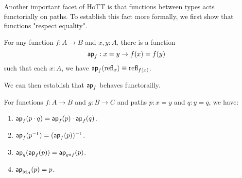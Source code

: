 \documentclass[main.tex]{subfiles}
\begin{document}
Another important facet of HoTT is that functions between types acts functorially on paths. To establish this fact more formally, we
first show that functions "respect equality".
\begin{lemma}
    For any function $f : A \to B$ and $x,y : A$, there is a function
    $$\mathsf{ap}_{f}: x = y \to f(x) = f(y)$$
    such that each $x : A$, we have $\mathsf{ap}_{f}(\text{refl}_{x}) \equiv \text{refl}_{f(x)}$.
\end{lemma}

We can then establish that $\mathsf{ap}_{f}$ behaves functorailly.

\begin{lemma}
    For functions $f : A \to B$ and $g : B \to C$ and paths $p : x = y$ and $q : y = q$, we have:
    \begin{enumerate}
        \item $\mathsf{ap}_{f}(p \cdot q) = \mathsf{ap}_{f}(p)\cdot \mathsf{ap}_{f}(q)$.
        \item $\mathsf{ap}_{f}(p^{-1}) = (\mathsf{ap}_{f}(p))^{-1}$.
        \item $\mathsf{ap}_{g}(\mathsf{ap}_{f}(p)) = \mathsf{ap}_{g \circ f}(p)$.
        \item $\mathsf{ap}_{\text{id}_{A}}(p) = p$.
    \end{enumerate}
\end{lemma}
\end{document}
